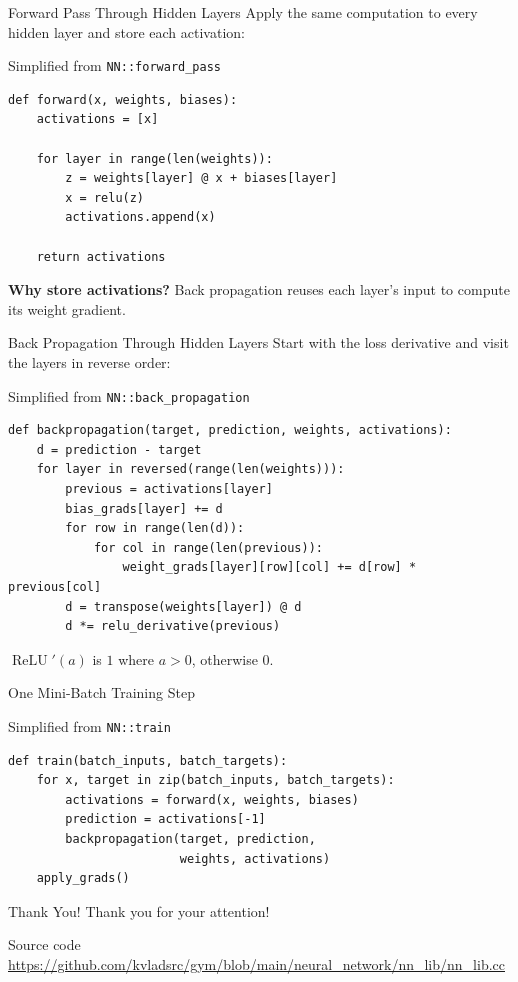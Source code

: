 \documentclass[aspectratio=169]{beamer}
\begin{document}
\begin{frame}[fragile]{Forward Pass Through Hidden Layers}
  \small
  Apply the same computation to every hidden layer and store each activation:

  \begin{block}{Simplified from \texttt{NN::forward\_pass}}
\begin{verbatim}
def forward(x, weights, biases):
    activations = [x]

    for layer in range(len(weights)):
        z = weights[layer] @ x + biases[layer]
        x = relu(z)
        activations.append(x)

    return activations
\end{verbatim}
  \end{block}

  \vspace{0.3em}
  {\footnotesize
    \textbf{Why store activations?} Back propagation reuses each layer's input
    to compute its weight gradient.
  }
\end{frame}

\begin{frame}[fragile]{Back Propagation Through Hidden Layers}
  \footnotesize
  Start with the loss derivative and visit the layers in reverse order:

  \begin{block}{Simplified from \texttt{NN::back\_propagation}}
\begin{verbatim}
def backpropagation(target, prediction, weights, activations):
    d = prediction - target
    for layer in reversed(range(len(weights))):
        previous = activations[layer]
        bias_grads[layer] += d
        for row in range(len(d)):
            for col in range(len(previous)):
                weight_grads[layer][row][col] += d[row] * previous[col]
        d = transpose(weights[layer]) @ d
        d *= relu_derivative(previous)
\end{verbatim}
  \end{block}

  {\scriptsize
    $\operatorname{ReLU}'(a)$ is $1$ where $a>0$, otherwise $0$.\par
  }
\end{frame}

\begin{frame}[fragile]{One Mini-Batch Training Step}
  \footnotesize
  \begin{block}{Simplified from \texttt{NN::train}}
\begin{verbatim}
def train(batch_inputs, batch_targets):
    for x, target in zip(batch_inputs, batch_targets):
        activations = forward(x, weights, biases)
        prediction = activations[-1]
        backpropagation(target, prediction,
                        weights, activations)
    apply_grads()
\end{verbatim}
  \end{block}
\end{frame}

\begin{frame}{Thank You!}
  \centering
  \vfill
  {\Huge Thank you for your attention!}

  \vspace{2em}
  \begin{block}{Source code}
    \centering
    {\scriptsize
      \url{https://github.com/kvladsrc/gym/blob/main/neural_network/nn_lib/nn_lib.cc}
    }
  \end{block}
  \vfill
\end{frame}
\end{document}
